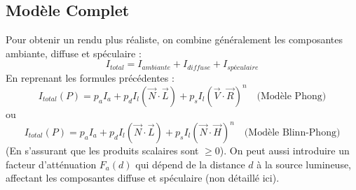 \subsection{Modèle Complet}
Pour obtenir un rendu plus réaliste, on combine généralement les composantes ambiante, diffuse et spéculaire :
\[ I_{total} = I_{ambiante} + I_{diffuse} + I_{spéculaire} \]
En reprenant les formules précédentes :
\[ I_{total}(P) = p_a I_a + p_d I_l (\vec{N} \cdot \vec{L}) + p_s I_l (\vec{V} \cdot \vec{R})^n \quad \text{(Modèle Phong)} \]
ou
\[ I_{total}(P) = p_a I_a + p_d I_l (\vec{N} \cdot \vec{L}) + p_s I_l (\vec{N} \cdot \vec{H})^n \quad \text{(Modèle Blinn-Phong)} \]
(En s'assurant que les produits scalaires sont \(\ge 0\)).
On peut aussi introduire un facteur d'atténuation \(F_a(d)\) qui dépend de la distance \(d\) à la source lumineuse, affectant les composantes diffuse et spéculaire (non détaillé ici).
